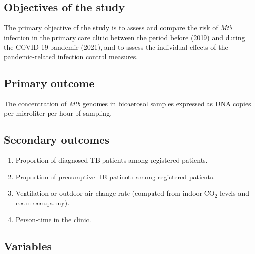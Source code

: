 \documentclass{article}
\begin{document}
\subsection{Objectives of the study}

The primary objective of the study is to assess and compare the risk of \emph{Mtb} infection in the primary care clinic between the period before (2019) and during the COVID-19 pandemic (2021), and to assess the individual effects of the pandemic-related infection control measures. 

\subsection{Primary outcome}

The concentration of \emph{Mtb} genomes in bioaerosol samples expressed as DNA copies per microliter per hour of sampling.  


\subsection{Secondary outcomes}

\begin{enumerate}
    \item Proportion of diagnosed TB patients among registered patients.
    \item Proportion of presumptive TB patients among registered patients.
    \item Ventilation or outdoor air change rate (computed from indoor CO$_2$ levels and room occupancy).
    \item Person-time in the clinic. 
\end{enumerate}

\subsection{Variables}
\end{document}
